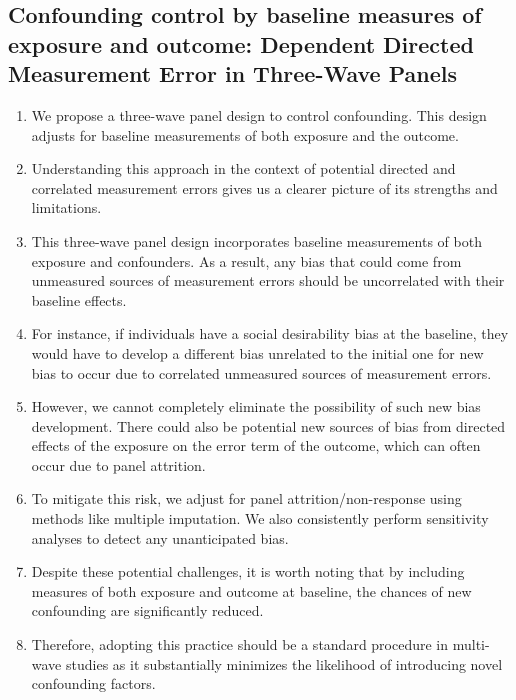 \documentclass[
  singlecolumn]{report}
\begin{document}
\hypertarget{confounding-control-by-baseline-measures-of-exposure-and-outcome-dependent-directed-measurement-error-in-three-wave-panels}{%
\subsection{Confounding control by baseline measures of exposure and
outcome: Dependent Directed Measurement Error in Three-Wave
Panels}\label{confounding-control-by-baseline-measures-of-exposure-and-outcome-dependent-directed-measurement-error-in-three-wave-panels}}

\begin{enumerate}
\def\labelenumi{\arabic{enumi}.}
\item
  We propose a three-wave panel design to control confounding. This
  design adjusts for baseline measurements of both exposure and the
  outcome.
\item
  Understanding this approach in the context of potential directed and
  correlated measurement errors gives us a clearer picture of its
  strengths and limitations.
\item
  This three-wave panel design incorporates baseline measurements of
  both exposure and confounders. As a result, any bias that could come
  from unmeasured sources of measurement errors should be uncorrelated
  with their baseline effects.
\item
  For instance, if individuals have a social desirability bias at the
  baseline, they would have to develop a different bias unrelated to the
  initial one for new bias to occur due to correlated unmeasured sources
  of measurement errors.
\item
  However, we cannot completely eliminate the possibility of such new
  bias development. There could also be potential new sources of bias
  from directed effects of the exposure on the error term of the
  outcome, which can often occur due to panel attrition.
\item
  To mitigate this risk, we adjust for panel attrition/non-response
  using methods like multiple imputation. We also consistently perform
  sensitivity analyses to detect any unanticipated bias.
\item
  Despite these potential challenges, it is worth noting that by
  including measures of both exposure and outcome at baseline, the
  chances of new confounding are significantly reduced.
\item
  Therefore, adopting this practice should be a standard procedure in
  multi-wave studies as it substantially minimizes the likelihood of
  introducing novel confounding factors.
\end{enumerate}
\end{document}
